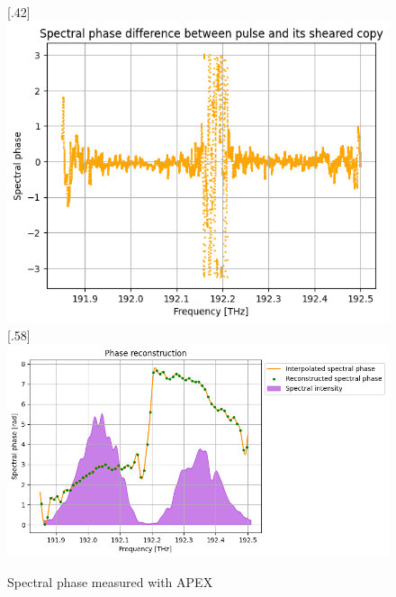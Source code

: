 \documentclass{article}
\begin{document}
\begin{figure}[H]

\caption{Spectral phase measured with APEX}
[.42\linewidth]{%
\includegraphics[width=\linewidth]{apex}%
}
\hfill
{}[.58\linewidth]{%
\includegraphics[width=\linewidth]{apex_2}%
}

\label{apex}
\end{figure}
\end{document}
